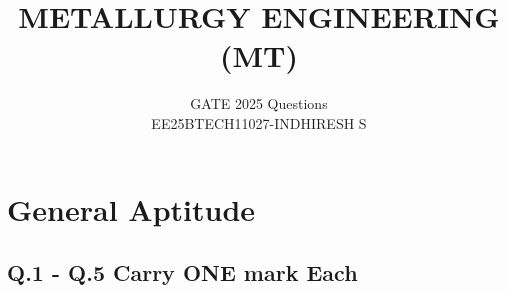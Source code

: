 \documentclass[journal]{IEEEtran}
\theoremstyle{remark}
\begin{document}

\onecolumn

\title{METALLURGY ENGINEERING (MT)}
\author{GATE 2025 Questions\\EE25BTECH11027-INDHIRESH S}
\maketitle

\renewcommand{\thefigure}{\theenumi}
\renewcommand{\thetable}{\theenumi}

\section*{General Aptitude}
\subsection*{Q.1 - Q.5 Carry ONE mark Each}
\end{document}
